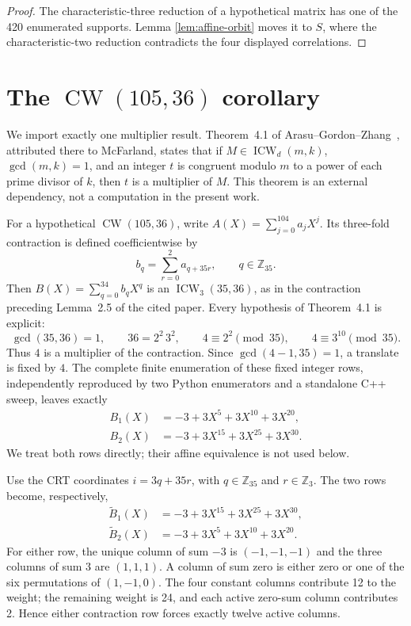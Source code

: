 \documentclass[10pt]{article}
\newcommand{\Z}{\mathbb Z}
\newcommand{\CW}{\operatorname{CW}}
\begin{document}
\begin{proof}
The characteristic-three reduction of a hypothetical matrix has one of the
420 enumerated supports.  Lemma \ref{lem:affine-orbit} moves it to $S$, where
the characteristic-two reduction contradicts the four displayed
correlations.
\end{proof}

\section{The \texorpdfstring{$\CW(105,36)$}{CW(105,36)} corollary}

We import exactly one multiplier result.  Theorem~4.1 of
Arasu--Gordon--Zhang~\cite{ArasuGordonZhang2021}, attributed there to
McFarland, states that if $M\in\operatorname{ICW}_d(m,k)$,
$\gcd(m,k)=1$, and an integer $t$ is congruent modulo $m$ to a power of
each prime divisor of $k$, then $t$ is a multiplier of $M$.  This theorem is
an external dependency, not a computation in the present work.

For a hypothetical $\CW(105,36)$, write
$A(X)=\sum_{j=0}^{104}a_jX^j$.  Its three-fold contraction is defined
coefficientwise by
\[
 b_q=\sum_{r=0}^{2}a_{q+35r},\qquad q\in\mathbb Z_{35}.
\]
Then $B(X)=\sum_{q=0}^{34}b_qX^q$ is an
$\operatorname{ICW}_3(35,36)$, as in the contraction preceding Lemma~2.5
of the cited paper.  Every hypothesis of Theorem~4.1 is explicit:
\[
 \gcd(35,36)=1,\qquad 36=2^2\,3^2,\qquad
 4\equiv2^2\pmod {35},\qquad 4\equiv 3^{10}\pmod {35}.
\]
Thus $4$ is a multiplier of the contraction.  Since
$\gcd(4-1,35)=1$, a translate is fixed by $4$.  The complete finite
enumeration of these fixed integer rows, independently reproduced by two
Python enumerators and a standalone C++ sweep, leaves exactly
\[
\begin{aligned}
 B_1(X)&=-3+3X^5+3X^{10}+3X^{20},\\
 B_2(X)&=-3+3X^{15}+3X^{25}+3X^{30}.
\end{aligned}
\]
We treat both rows directly; their affine equivalence is not used below.

Use the CRT coordinates $i=3q+35r$, with $q\in\Z_{35}$ and
$r\in\Z_3$.  The two rows become, respectively,
\[
\begin{aligned}
 \widetilde B_1(X)&=-3+3X^{15}+3X^{25}+3X^{30},\\
 \widetilde B_2(X)&=-3+3X^5+3X^{10}+3X^{20}.
\end{aligned}
\]
For either row, the unique column of sum $-3$ is $(-1,-1,-1)$ and the
three columns of sum $3$ are $(1,1,1)$.  A column of sum zero is either
zero or one of the six permutations of $(1,-1,0)$.  The four constant
columns contribute 12 to the weight; the remaining weight is 24, and each
active zero-sum column contributes 2.  Hence either contraction row forces
exactly twelve active columns.
\end{document}
